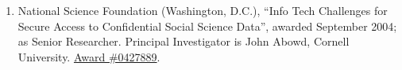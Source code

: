 \documentclass[10pt,letterpaper]{report}
\begin{document}
\begin{enumerate}
\item National Science Foundation (Washington, D.C.),  ``Info
  Tech Challenges for Secure Access to Confidential Social Science Data'',
  awarded September 2004; as Senior Researcher. Principal Investigator is John Abowd, Cornell
  University.   \href{http://www.nsf.gov/awardsearch/showAward.do?AwardNumber=0427889}{Award \#0427889}.
\end{enumerate}
\end{document}
